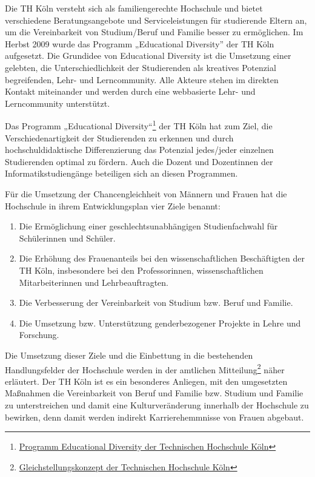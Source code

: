 Die TH Köln versteht sich als familiengerechte Hochschule und bietet
verschiedene Beratungsangebote und Serviceleistungen für studierende
Eltern an, um die Vereinbarkeit von Studium/Beruf und Familie besser zu
ermöglichen. Im Herbst 2009 wurde das Programm „Educational Diversity''
der TH Köln aufgesetzt. Die Grundidee von Educational Diversity ist die
Umsetzung einer gelebten, die Unterschiedlichkeit der Studierenden als
kreatives Potenzial begreifenden, Lehr- und Lerncommunity. Alle Akteure
stehen im direkten Kontakt miteinander und werden durch eine webbasierte
Lehr- und Lerncommunity unterstützt.

Das Programm „Educational Diversity``\footnote{\href{https://www.th-koeln.de/hochschule/educational-diversity_5710.php}{Programm
  Educational Diversity der Technischen Hochschule Köln}} der TH Köln
hat zum Ziel, die Verschiedenartigkeit der Studierenden zu erkennen und
durch hochschuldidaktische Differenzierung das Potenzial jedes/jeder
einzelnen Studierenden optimal zu fördern. Auch die Dozent und
Dozentinnen der Informatikstudiengänge beteiligen sich an diesen
Programmen.

Für die Umsetzung der Chancengleichheit von Männern und Frauen hat die
Hochschule in ihrem Entwicklungsplan vier Ziele benannt:

\begin{enumerate}
\def\labelenumi{\arabic{enumi}.}
\tightlist
\item
  Die Ermöglichung einer geschlechtsunabhängigen Studienfachwahl für
  Schülerinnen und Schüler.
\item
  Die Erhöhung des Frauenanteils bei den wissenschaftlichen
  Beschäftigten der TH Köln, insbesondere bei den Professorinnen,
  wissenschaftlichen Mitarbeiterinnen und Lehrbeauftragten.
\item
  Die Verbesserung der Vereinbarkeit von Studium bzw. Beruf und Familie.
\item
  Die Umsetzung bzw. Unterstützung genderbezogener Projekte in Lehre und
  Forschung.
\end{enumerate}

Die Umsetzung dieser Ziele und die Einbettung in die bestehenden
Handlungsfelder der Hochschule werden in der amtlichen
Mitteilung\footnote{\href{http://www.fh-koeln.de/mam/downloads/deutsch/hochschule/profil/gleichstellung/gleichstellungskonzept.pdf}{Gleichstellungskonzept
  der Technischen Hochschule Köln}} näher erläutert. Der TH Köln ist es
ein besonderes Anliegen, mit den umgesetzten Maßnahmen die Vereinbarkeit
von Beruf und Familie bzw. Studium und Familie zu unterstreichen und
damit eine Kulturveränderung innerhalb der Hochschule zu bewirken, denn
damit werden indirekt Karrierehemmnisse von Frauen abgebaut.

